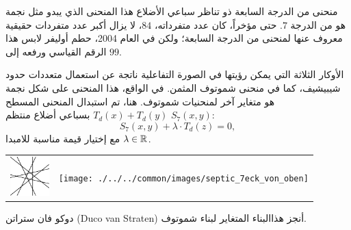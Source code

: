 \begin{surferPage}{منحنى من الدرجة السابعة ذو تناظر سباعي الأضلاع}
هذا المنحنى الذي يبدو مثل نجمة هو من الدرجة $7$. 
   حتى مؤخراً، كان عدد متفرداته، $84$، لا يزال أكبر عدد متفردات حقيقية معروف عنها لمنحنى من الدرجة السابعة؛ 
   ولكن في العام 2004، حطم أوليفر لابس هذا الرقم القياسي ورفعه إلى $99$.  
  
    الأوكار الثلاثة التي يمكن رؤيتها في الصورة التفاعلية ناتجة عن استعمال متعددات حدود شيبيشيف، كما في منحنى شموتوف المثمن.  
    في الواقع، هذا المنحنى على شكل نجمة هو متغاير آخر لمنحنيات شموتوف.
    هنا، تم استبدال المنحنى المسطح $T_d(x)+T_d(y)$ بسباعي أضلاع منتظم $S_7(x,y)$: 
   \[S_7(x,y) + \lambda \cdot T_d(z) = 0,\]
   مع إختيار قيمة مناسبة للامبدا  $\lambda\in{\mathbb R}$. 
    \vspace*{-0.3em}
    \begin{center}
      \begin{tabular}{c@{\qquad}c}
        \includegraphics[height=1.5cm]{./../../common/images/labsseptic1.pdf}
        &
        \texttt{[image: ./../../common/images/septic\_7eck\_von\_oben]}
      \end{tabular}
    \end{center}
    \vspace*{-0.3em}   
    دوكو فان ستراتن
     \textenglish{(Duco van Straten)}
      أنجز هذاالبناء المتغاير لبناء شموتوف.
\end{surferPage}
